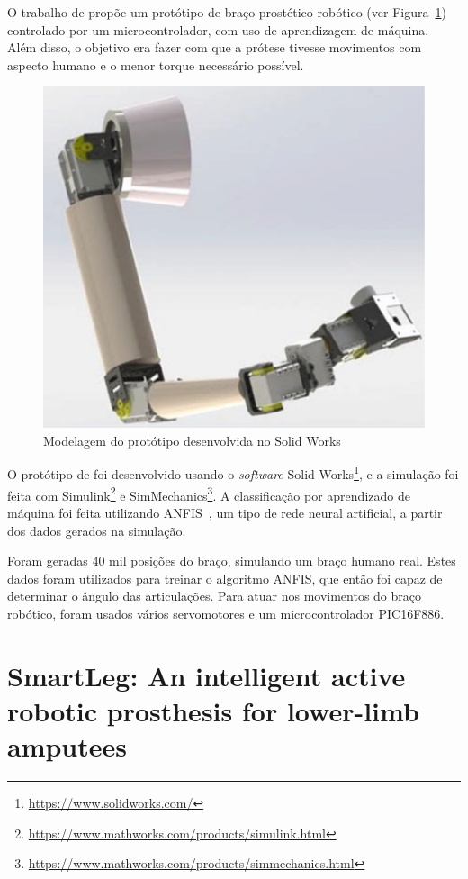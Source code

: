 
O trabalho de  propõe um protótipo de braço prostético robótico (ver Figura~\ref{fig:rel_kumar_1}) controlado por um microcontrolador, com uso de aprendizagem de máquina. Além disso, o objetivo era fazer com que a prótese tivesse movimentos com aspecto humano e o menor torque necessário possível.

\begin{figure}[!htp]
	\caption{\label{fig:rel_kumar_1}Modelagem do protótipo desenvolvida no Solid Works}
	\begin{center}
	    \includegraphics[width=.3\textwidth]{resources/rel_kumar_1}
	\end{center}
\end{figure}

O protótipo de  foi desenvolvido usando o \textit{software} Solid Works\footnote{\url{https://www.solidworks.com/}}, e a simulação foi feita com Simulink\footnote{\url{https://www.mathworks.com/products/simulink.html}} e SimMechanics\footnote{\url{https://www.mathworks.com/products/simmechanics.html}}. A classificação por aprendizado de máquina foi feita utilizando ANFIS~\cite{jang:1993anfis}, um tipo de rede neural artificial, a partir dos dados gerados na simulação.

Foram geradas 40 mil posições do braço, simulando um braço humano real. Estes dados foram utilizados para treinar o algoritmo ANFIS, que então foi capaz de determinar o ângulo das articulações. Para atuar nos movimentos do braço robótico, foram usados vários servomotores e um microcontrolador PIC16F886.


\section{SmartLeg: An intelligent active robotic prosthesis for lower-limb amputees}\label{sec:rel_smartleg}

